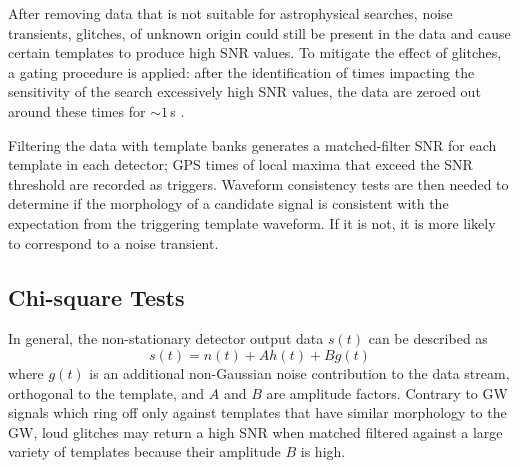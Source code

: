 \documentclass[binding=0.6cm, LaM]{sapthesis}
\begin{document}
        After removing data that is not suitable for astrophysical searches, 
        noise transients, glitches, of unknown origin could still be present in the data 
        and cause certain templates to produce high SNR values.
        To mitigate the effect of glitches, a gating procedure is applied:
        after the identification of times impacting the sensitivity of the search excessively high SNR values,
        the data are zeroed out around these times for $\sim 1\,$s \cite{42}.

        Filtering the data with template banks generates a matched-filter SNR for each template in each detector;
        GPS times of local maxima that exceed the SNR threshold are recorded as triggers. 
        Waveform consistency tests are then needed to determine if the morphology 
        of a candidate signal is consistent with the expectation from the triggering template waveform.  If it is not,
        it is more likely to correspond to a noise transient.
	
\subsection{Chi-square Tests}
\label{subsec:chi_square_test}
        In general, the non-stationary detector output data $s(t)$ can be described as
        \begin{equation}
          s(t) = n(t) + Ah(t) + Bg(t) 
        \end{equation}
	where $g(t)$ is an additional non-Gaussian noise contribution to the data stream, 
	orthogonal to the template, and $A$ and $B$ are amplitude factors. 
	Contrary to GW signals which ring off only against templates 
	that have similar morphology to the GW, 
	loud glitches may return a high SNR when matched filtered against a 
	large variety of templates because their amplitude $B$ is high.
\end{document}
